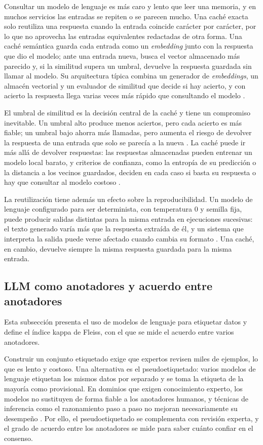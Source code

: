 Consultar un modelo de lenguaje es más caro y lento que leer una memoria, y en muchos servicios las entradas se repiten o se parecen mucho. Una caché exacta solo reutiliza una respuesta cuando la entrada coincide carácter por carácter, por lo que no aprovecha las entradas equivalentes redactadas de otra forma. Una caché semántica guarda cada entrada como un \textit{embedding} junto con la respuesta que dio el modelo; ante una entrada nueva, busca el vector almacenado más parecido y, si la similitud supera un umbral, devuelve la respuesta guardada sin llamar al modelo. Su arquitectura típica combina un generador de \textit{embeddings}, un almacén vectorial y un evaluador de similitud que decide si hay acierto, y con acierto la respuesta llega varias veces más rápido que consultando el modelo \cite{fu2023_gptcache}.

El umbral de similitud es la decisión central de la caché y tiene un compromiso inevitable. Un umbral alto produce menos aciertos, pero cada acierto es más fiable; un umbral bajo ahorra más llamadas, pero aumenta el riesgo de devolver la respuesta de una entrada que solo se parecía a la nueva \cite{ak2025_siu}. La caché puede ir más allá de devolver respuestas: las respuestas almacenadas pueden entrenar un modelo local barato, y criterios de confianza, como la entropía de su predicción o la distancia a los vecinos guardados, deciden en cada caso si basta su respuesta o hay que consultar al modelo costoso \cite{stogiannidis2023_cache}.

La reutilización tiene además un efecto sobre la reproducibilidad. Un modelo de lenguaje configurado para ser determinista, con temperatura 0 y semilla fija, puede producir salidas distintas para la misma entrada en ejecuciones sucesivas: el texto generado varía más que la respuesta extraída de él, y un sistema que interpreta la salida puede verse afectado cuando cambia su formato \cite{atil2025_nondeterminism}. Una caché, en cambio, devuelve siempre la misma respuesta guardada para la misma entrada.

\subsection{LLM como anotadores y acuerdo entre anotadores}\label{sec:mt_anotacion}

Esta subsección presenta el uso de modelos de lenguaje para etiquetar datos y define el índice kappa de Fleiss, con el que se mide el acuerdo entre varios anotadores.

Construir un conjunto etiquetado exige que expertos revisen miles de ejemplos, lo que es lento y costoso. Una alternativa es el pseudoetiquetado: varios modelos de lenguaje etiquetan los mismos datos por separado y se toma la etiqueta de la mayoría como provisional. En dominios que exigen conocimiento experto, los modelos no sustituyen de forma fiable a los anotadores humanos, y técnicas de inferencia como el razonamiento paso a paso no mejoran necesariamente su desempeño \cite{tseng2025_expert_annotators}. Por ello, el pseudoetiquetado se complementa con revisión experta, y el grado de acuerdo entre los anotadores se mide para saber cuánto confiar en el consenso.

